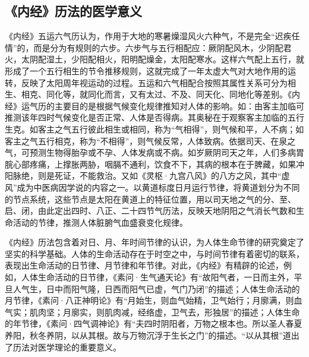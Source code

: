 \documentclass[draft,12pt]{ctexbook}
\begin{document}
\subsection{《内经》历法的医学意义}%

《内经》五运六气历认为，作用于大地的寒暑燥湿风火六种气，不是完全“迟疾任情”的，而是分为有规则的六步。六步气与五行相配应：厥阴配风木，少阴配君火，太阴配湿土，少阳配相火，阳明配燥金，太阳配寒水。这样六气配上五行，就形成了一个五行相生的节令推移规则，这就完成了一年太虚大气对大地作用的运转，反映了太阳周年视运动的过程。五运和六气相配合按照其属性关系可分为相生、相克、同化等，就同化而言，又有太过、不及、同天化、同地化等差别。《内经》运气历的主要目的是根据气候变化规律推知对人体的影响。如：由客主加临可推测该年四时气候变化是否正常、人体是否得病。其奥秘在于观察客主加临的五行生克。如客主之气五行彼此相生或相同，称为“气相得”，则气候和平，人不病；如客主之气五行相克，称为“不相得”，则气候反常，人体致病。依据司天、在泉之气，可预测生物得胎孕或不孕、人体发病或不病。如岁厥阴司天之年，人们多病胃脘心部疼痛，上撑胀两胁，咽膈不通利，饮食不下，其病的根本在于脾藏，如果冲阳脉绝，则是死证，不能救治。又如《灵枢·九宫八风》的八方之风，其中“虚风”成为中医病因学说的内容之一。以黄道标度日月运行节律，将黄道划分为不同的节点系统，这些节点是太阳在黄道上的特征位置，用以司天地之气的分、至、启、闭，由此定出四时、八正、二十四节气历法，反映天地阴阳之气消长气数和生命活动的节律，推测人体脏腑气血盛衰变化规律。

《内经》历法包含着对日、月、年时间节律的认识，为人体生命节律的研究奠定了坚实的科学基础。人体的生命活动存在于时空之中，与时间节律有着密切的联系，表现出生命活动的日节律、月节律和年节律。对此，《内经》有精辟的论述，例如，人体生命活动的日节律，《素问·生气通天论》有“故阳气者，一日而主外，平旦人气生，日中而阳气隆，日西而阳气已虚，气门乃闭”的描述；人体生命活动的月节律，《素问·八正神明论》有“月始生，则血气始精，卫气始行；月廓满，则血气实；肌肉坚；月廓实，则肌肉减，经络虚，卫气去，形独居”的描述；人体生命的年节律，《素问·四气调神论》有“夫四时阴阳者，万物之根本也。所以圣人春夏养阳，秋冬养阴，以从其根。故与万物沉浮于生长之门”的描述。“以从其根”道出了历法对医学理论的重要意义。

\ifx \allfiles \undefined
\end{document}
